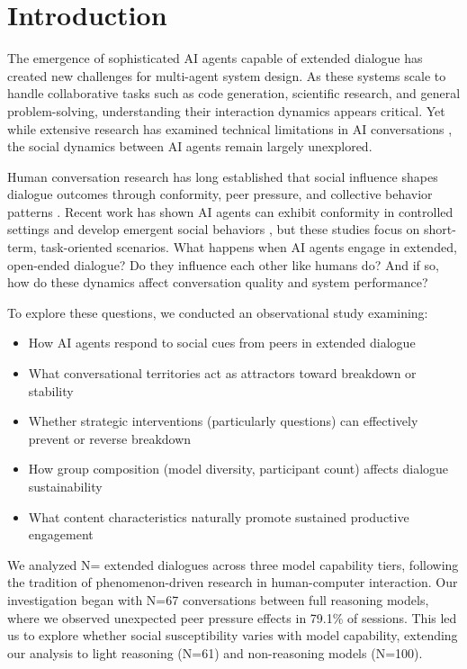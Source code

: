 \documentclass[11pt,letterpaper]{article}
\newcommand{\exponedataTotalSessionsRaw}{67}
\newcommand{\exponedataTotalSessions}{N=\exponedataTotalSessionsRaw}
\newcommand{\exponedataPeerPressurePercentage}{79.1\%}
\newcommand{\exptwoTotalSessionsRaw}{61}
\newcommand{\exptwoTotalSessions}{N=\exptwoTotalSessionsRaw}
\newcommand{\expthreeTotalSessionsRaw}{100}
\newcommand{\expthreeTotalSessions}{N=\expthreeTotalSessionsRaw}
\newcommand{\totalAllPhasesRaw}{\fpeval{\exponedataTotalSessionsRaw + \exptwoTotalSessionsRaw + \expthreeTotalSessionsRaw}}
\newcommand{\totalAllPhases}{N=\totalAllPhasesRaw}
\begin{document}
\section{Introduction}

The emergence of sophisticated AI agents capable of extended dialogue has created new challenges for multi-agent system design. As these systems scale to handle collaborative tasks such as code generation, scientific research, and general problem-solving, understanding their interaction dynamics appears critical. Yet while extensive research has examined technical limitations in AI conversations \citep{laban2025lost}, the social dynamics between AI agents remain largely unexplored.

Human conversation research has long established that social influence shapes dialogue outcomes through conformity, peer pressure, and collective behavior patterns \citep{asch1956studies}. Recent work has shown AI agents can exhibit conformity in controlled settings \citep{kyrlitsias2018conformity} and develop emergent social behaviors \citep{ashery2025emergent}, but these studies focus on short-term, task-oriented scenarios. What happens when AI agents engage in extended, open-ended dialogue? Do they influence each other like humans do? And if so, how do these dynamics affect conversation quality and system performance?

To explore these questions, we conducted an observational study examining:
\begin{itemize}
    \item How AI agents respond to social cues from peers in extended dialogue
    \item What conversational territories act as attractors toward breakdown or stability
    \item Whether strategic interventions (particularly questions) can effectively prevent or reverse breakdown
    \item How group composition (model diversity, participant count) affects dialogue sustainability
    \item What content characteristics naturally promote sustained productive engagement
\end{itemize}

We analyzed \totalAllPhases{} extended dialogues across three model capability tiers, following the tradition of phenomenon-driven research in human-computer interaction. Our investigation began with \exponedataTotalSessions{} conversations between full reasoning models, where we observed unexpected peer pressure effects in \exponedataPeerPressurePercentage{} of sessions. This led us to explore whether social susceptibility varies with model capability, extending our analysis to light reasoning (\exptwoTotalSessions{}) and non-reasoning models (\expthreeTotalSessions{}).
\end{document}
